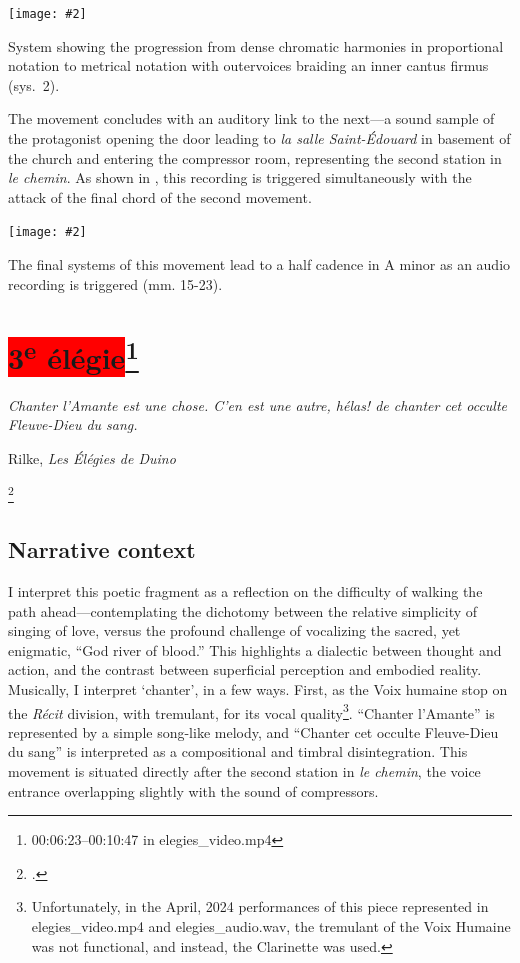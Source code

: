 \documentclass[12pt,twoside,maitrise]{dms_ks}
\newcommand{\customincludeexamples}[4][]{%
    \begin{example}[H]
        \centering
        \texttt{[image: \#2]}
        \caption{#4}
	\label{#3} 
    \end{example}
}
\theoremstyle{definition}
\begin{document}
{\customincludeexamples[width=\textwidth]{2e_2}{ex:2e_2}{System showing the progression from dense chromatic harmonies in proportional notation to metrical notation with outervoices braiding an inner cantus firmus (sys.~2).}

The movement concludes with an auditory link to the next---a sound sample of the protagonist opening the door leading to \textit{la salle Saint-Édouard} in basement of the church and entering the compressor room, representing the second station in \textit{le chemin}.
As shown in , this recording is triggered simultaneously with the attack of the final chord of the second movement.

\customincludeexamples[width=\textwidth]{2e_3}{ex:2e_3}{The final systems of this movement lead to a half cadence in A minor as an audio recording is triggered (mm. 15-23).}

\section{\colorbox{red}{3\textsuperscript{e} élégie}\footnote{00:06:23--00:10:47 in elegies\_video.mp4}}

\epigraph{\textit{Chanter l'Amante est une chose. C'en est une autre, hélas! de chanter cet occulte Fleuve-Dieu du sang.}}{Rilke, \textit{Les Élégies de Duino}\protect\footnotemark}

\footcitetext[29]{rilke_egies_1986}

\subsection{Narrative context}

I interpret this poetic fragment as a reflection on the difficulty of walking the path ahead---contemplating the dichotomy between the relative simplicity of singing of love, versus the profound challenge of vocalizing the sacred, yet enigmatic, “God river of blood.”  
This highlights a dialectic between thought and action, and the contrast between superficial perception and embodied reality.  
Musically, I interpret `chanter', in a few ways. 
First, as the Voix humaine stop on the \textit{Récit} division, with tremulant, for its vocal quality\footnote{Unfortunately, in the April, 2024 performances of this piece represented in elegies\_video.mp4 and elegies\_audio.wav, the tremulant of the Voix Humaine was not functional, and instead, the Clarinette was used.}.  
“Chanter l'Amante” is represented by a simple song-like melody, and “Chanter cet occulte Fleuve-Dieu du sang” is interpreted as a compositional and timbral disintegration. 
This movement is situated directly after the second station in \textit{le chemin}, the voice entrance overlapping slightly with the sound of compressors.

}
\end{document}
